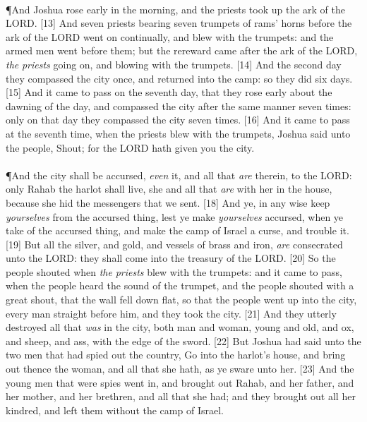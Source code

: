 \\
\P \textcolor[cmyk]{0.99998,1,0,0}{And Joshua rose early in the morning, and the priests took up the ark of the LORD.}
[13] \textcolor[cmyk]{0.99998,1,0,0}{And seven priests bearing seven trumpets of rams' horns before the ark of the LORD went on continually, and blew with the trumpets: and the armed men went before them; but the rereward came after the ark of the LORD, \emph{the} \emph{priests} going on, and blowing with the trumpets.}
[14] \textcolor[cmyk]{0.99998,1,0,0}{And the second day they compassed the city once, and returned into the camp: so they did six days.}
[15] \textcolor[cmyk]{0.99998,1,0,0}{And it came to pass on the seventh day, that they rose early about the dawning of the day, and compassed the city after the same manner seven times: only on that day they compassed the city seven times.}
[16] \textcolor[cmyk]{0.99998,1,0,0}{And it came to pass at the seventh time, when the priests blew with the trumpets, Joshua said unto the people, Shout; for the LORD hath given you the city.}\\
\\
\P \textcolor[cmyk]{0.99998,1,0,0}{And the city shall be accursed, \emph{even} it, and all that \emph{are} therein, to the LORD: only Rahab the harlot shall live, she and all that \emph{are} with her in the house, because she hid the messengers that we sent.}
[18] \textcolor[cmyk]{0.99998,1,0,0}{And ye, in any wise keep \emph{yourselves} from the accursed thing, lest ye make \emph{yourselves} accursed, when ye take of the accursed thing, and make the camp of Israel a curse, and trouble it.}
[19] \textcolor[cmyk]{0.99998,1,0,0}{But all the silver, and gold, and vessels of brass and iron, \emph{are} consecrated unto the LORD: they shall come into the treasury of the LORD.}
[20] \textcolor[cmyk]{0.99998,1,0,0}{So the people shouted when \emph{the} \emph{priests} blew with the trumpets: and it came to pass, when the people heard the sound of the trumpet, and the people shouted with a great shout, that the wall fell down flat, so that the people went up into the city, every man straight before him, and they took the city.}
[21] \textcolor[cmyk]{0.99998,1,0,0}{And they utterly destroyed all that \emph{was} in the city, both man and woman, young and old, and ox, and sheep, and ass, with the edge of the sword.}
[22] \textcolor[cmyk]{0.99998,1,0,0}{But Joshua had said unto the two men that had spied out the country, Go into the harlot's house, and bring out thence the woman, and all that she hath, as ye sware unto her.}
[23] \textcolor[cmyk]{0.99998,1,0,0}{And the young men that were spies went in, and brought out Rahab, and her father, and her mother, and her brethren, and all that she had; and they brought out all her kindred, and left them without the camp of Israel.}

